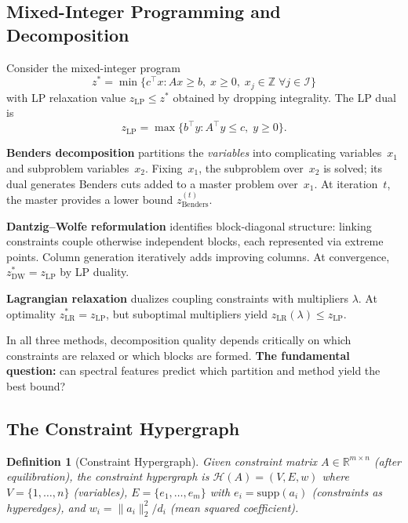\documentclass[12pt]{article}
\newtheorem{definition}[theorem]{Definition}
\begin{document}
\subsection{Mixed-Integer Programming and Decomposition}
\label{sec:mip-decomp}

Consider the mixed-integer program
\begin{equation}\label{eq:mip}
  z^* = \min\{c^\top x : Ax \geq b,\; x \geq 0,\;
  x_j \in \mathbb{Z} \;\forall j \in \mathcal{I}\}
\end{equation}
with LP relaxation value $z_{\mathrm{LP}} \leq z^*$ obtained by dropping
integrality.  The LP dual is
\begin{equation}\label{eq:lp-dual}
  z_{\mathrm{LP}} = \max\{b^\top y : A^\top y \leq c,\; y \geq 0\}.
\end{equation}

\textbf{Benders decomposition} \citep{benders1962partitioning} partitions
the \emph{variables} into complicating variables~$x_1$ and
subproblem variables~$x_2$.  Fixing~$x_1$, the subproblem over~$x_2$ is
solved; its dual generates Benders cuts added to a master problem over~$x_1$.
At iteration~$t$, the master provides a lower bound $z_{\mathrm{Benders}}^{(t)}$.

\textbf{Dantzig--Wolfe reformulation} \citep{dantzig1960decomposition}
identifies block-diagonal structure: linking constraints couple otherwise
independent blocks, each represented via extreme points.  Column generation
iteratively adds improving columns.  At convergence,
$z_{\mathrm{DW}}^* = z_{\mathrm{LP}}$ by LP duality.

\textbf{Lagrangian relaxation} \citep{fisher1981lagrangian,geoffrion1974lagrangean}
dualizes coupling constraints with multipliers $\lambda$.  At optimality
$z_{\mathrm{LR}}^* = z_{\mathrm{LP}}$, but suboptimal multipliers yield
$z_{\mathrm{LR}}(\lambda) \leq z_{\mathrm{LP}}$.

In all three methods, decomposition quality depends critically on which
constraints are relaxed or which blocks are formed.  \textbf{The
fundamental question:} can spectral features predict which partition and
method yield the best bound?

\subsection{The Constraint Hypergraph}
\label{sec:hypergraph}

\begin{definition}[Constraint Hypergraph]
\label{def:hypergraph}
Given constraint matrix $A \in \mathbb{R}^{m \times n}$ (after equilibration),
the constraint hypergraph is $\mathcal{H}(A) = (V, E, w)$ where
$V = \{1, \ldots, n\}$ (variables),
$E = \{e_1, \ldots, e_m\}$ with $e_i = \mathrm{supp}(a_i)$ (constraints as hyperedges),
and $w_i = \|a_i\|_2^2 / d_i$ (mean squared coefficient).
\end{definition}
\end{document}
